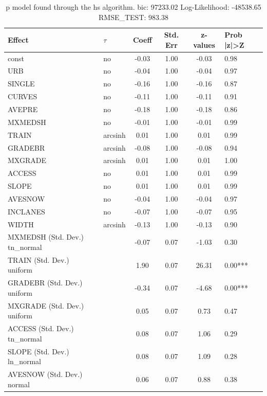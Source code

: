 \begin{table}
	\caption{p model found through the hs algorithm. bic: 97233.02 Log-Likelihood: -48538.65 RMSE_TEST: 983.38}
	\begin{center}
		\begin{tabular}{|l|l|c|c|c|l|}
			\hline
			Effect & $\tau$ & Coeff & Std. Err & z-values & Prob |z|>Z \\
			\hline
			const & no & -0.03 & 1.00 & -0.03 & 0.98 \\
			\hline
			URB & no & -0.04 & 1.00 & -0.04 & 0.97 \\
			\hline
			SINGLE & no & -0.16 & 1.00 & -0.16 & 0.87 \\
			\hline
			CURVES & no & -0.11 & 1.00 & -0.11 & 0.91 \\
			\hline
			AVEPRE & no & -0.18 & 1.00 & -0.18 & 0.86 \\
			\hline
			MXMEDSH & no & -0.01 & 1.00 & -0.01 & 0.99 \\
			\hline
			TRAIN & arcsinh & 0.01 & 1.00 & 0.01 & 0.99 \\
			\hline
			GRADEBR & arcsinh & -0.08 & 1.00 & -0.08 & 0.94 \\
			\hline
			MXGRADE & arcsinh & 0.01 & 1.00 & 0.01 & 1.00 \\
			\hline
			ACCESS & no & 0.01 & 1.00 & 0.01 & 0.99 \\
			\hline
			SLOPE & no & 0.01 & 1.00 & 0.01 & 0.99 \\
			\hline
			AVESNOW & no & -0.04 & 1.00 & -0.04 & 0.97 \\
			\hline
			INCLANES & no & -0.07 & 1.00 & -0.07 & 0.95 \\
			\hline
			WIDTH & arcsinh & -0.13 & 1.00 & -0.13 & 0.90 \\
			\hline
			MXMEDSH (Std. Dev.) tn_normal &  & -0.07 & 0.07 & -1.03 & 0.30 \\
			\hline
			TRAIN (Std. Dev.) uniform &  & 1.90 & 0.07 & 26.31 & 0.00*** \\
			\hline
			GRADEBR (Std. Dev.) uniform &  & -0.34 & 0.07 & -4.68 & 0.00*** \\
			\hline
			MXGRADE (Std. Dev.) uniform &  & 0.05 & 0.07 & 0.73 & 0.47 \\
			\hline
			ACCESS (Std. Dev.) tn_normal &  & 0.08 & 0.07 & 1.06 & 0.29 \\
			\hline
			SLOPE (Std. Dev.) ln_normal &  & 0.08 & 0.07 & 1.09 & 0.28 \\
			\hline
			AVESNOW (Std. Dev.) normal &  & 0.06 & 0.07 & 0.88 & 0.38 \\

\end{tabular}
\end{center}
\end{table}

